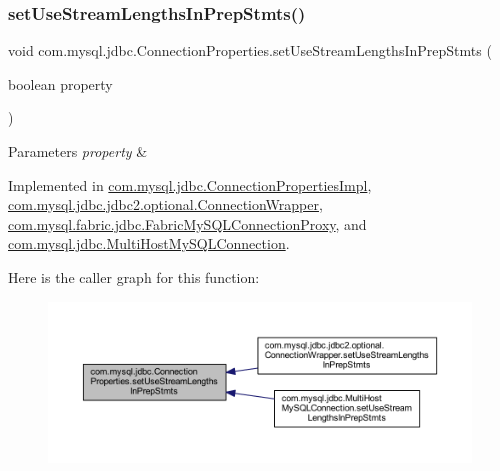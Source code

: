 \subsubsection{\texorpdfstring{set\+Use\+Stream\+Lengths\+In\+Prep\+Stmts()}{setUseStreamLengthsInPrepStmts()}}
{\footnotesize\ttfamily void com.\+mysql.\+jdbc.\+Connection\+Properties.\+set\+Use\+Stream\+Lengths\+In\+Prep\+Stmts (\begin{DoxyParamCaption}\item[{boolean}]{property }\end{DoxyParamCaption})}


\begin{DoxyParams}{Parameters}
{\em property} & \\
\hline
\end{DoxyParams}


Implemented in \mbox{\hyperlink{classcom_1_1mysql_1_1jdbc_1_1_connection_properties_impl_a74753aa2e027512442d0b3bbae3a2ed2}{com.\+mysql.\+jdbc.\+Connection\+Properties\+Impl}}, \mbox{\hyperlink{classcom_1_1mysql_1_1jdbc_1_1jdbc2_1_1optional_1_1_connection_wrapper_a9eadd4adb9ecde242f0656084f31f8c7}{com.\+mysql.\+jdbc.\+jdbc2.\+optional.\+Connection\+Wrapper}}, \mbox{\hyperlink{classcom_1_1mysql_1_1fabric_1_1jdbc_1_1_fabric_my_s_q_l_connection_proxy_a1260df118727a00af1189f53624b3e30}{com.\+mysql.\+fabric.\+jdbc.\+Fabric\+My\+S\+Q\+L\+Connection\+Proxy}}, and \mbox{\hyperlink{classcom_1_1mysql_1_1jdbc_1_1_multi_host_my_s_q_l_connection_a29c813718362120ef1f0b6e6f0b7bb0a}{com.\+mysql.\+jdbc.\+Multi\+Host\+My\+S\+Q\+L\+Connection}}.

Here is the caller graph for this function\+:\nopagebreak
\begin{figure}[H]
\begin{center}
\leavevmode
\includegraphics[width=350pt]{interfacecom_1_1mysql_1_1jdbc_1_1_connection_properties_a34c1ecb9d6258a0289516696cf8537be_icgraph}
\end{center}
\end{figure}
\mbox{\label{interfacecom_1_1mysql_1_1jdbc_1_1_connection_properties_a7f57a800fefe86a58c1ddfe7fd7d8ef2}} 
